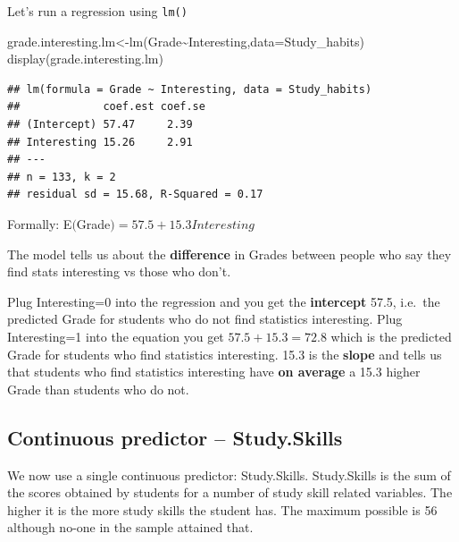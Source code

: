 \documentclass[
]{gitbook}
\newenvironment{Shaded}{\begin{snugshade}}{\end{snugshade}}
\newcommand{\AttributeTok}[1]{\textcolor[rgb]{0.77,0.63,0.00}{#1}}
\newcommand{\FunctionTok}[1]{\textcolor[rgb]{0.00,0.00,0.00}{#1}}
\newcommand{\NormalTok}[1]{#1}
\newcommand{\OtherTok}[1]{\textcolor[rgb]{0.56,0.35,0.01}{#1}}
\newcommand{\SpecialCharTok}[1]{\textcolor[rgb]{0.00,0.00,0.00}{#1}}
\begin{document}
\newpage

Let's run a regression using \texttt{lm()}

\begin{Shaded}
\begin{Highlighting}[]
\NormalTok{grade.interesting.lm}\OtherTok{\textless{}{-}}\FunctionTok{lm}\NormalTok{(Grade}\SpecialCharTok{\textasciitilde{}}\NormalTok{Interesting,}\AttributeTok{data=}\NormalTok{Study\_habits)}
\FunctionTok{display}\NormalTok{(grade.interesting.lm)}
\end{Highlighting}
\end{Shaded}

\begin{verbatim}
## lm(formula = Grade ~ Interesting, data = Study_habits)
##             coef.est coef.se
## (Intercept) 57.47     2.39  
## Interesting 15.26     2.91  
## ---
## n = 133, k = 2
## residual sd = 15.68, R-Squared = 0.17
\end{verbatim}

Formally: E\((\)Grade\()=57.5+15.3 Interesting\)

The model tells us about the \textbf{difference} in Grades between people who say they find stats interesting vs those who don't.

Plug Interesting=0 into the regression and you get the \textbf{intercept} 57.5, i.e.~the predicted Grade for students who do not find statistics interesting. Plug Interesting=1 into the equation you get \(57.5+15.3=72.8\) which is the predicted Grade for students who find statistics interesting. 15.3 is the \textbf{slope} and tells us that students who find statistics interesting have \textbf{on average} a 15.3 higher Grade than students who do not.

\hypertarget{continuous-predictor-study.skills}{%
\subsection{Continuous predictor -- Study.Skills}\label{continuous-predictor-study.skills}}

We now use a single continuous predictor: Study.Skills. Study.Skills is the sum of the scores obtained by students for a number of study skill related variables. The higher it is the more study skills the student has. The maximum possible is 56 although no-one in the sample attained that.

\end{document}
